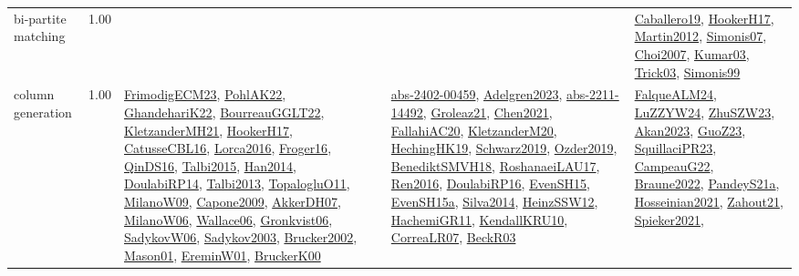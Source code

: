 {\begin{longtable}{p{3cm}r>{\raggedright\arraybackslash}p{6cm}>{\raggedright\arraybackslash}p{6cm}>{\raggedright\arraybackslash}p{8cm}}
\index{bi-partite matching}\index{Algorithms!bi-partite matching}bi-partite matching &  1.00 &  &  & \hyperref[detail:Caballero19]{Caballero19}, \hyperref[detail:HookerH17]{HookerH17}, \hyperref[detail:Martin2012]{Martin2012}, \hyperref[detail:Simonis07]{Simonis07}, \hyperref[detail:Choi2007]{Choi2007}, \hyperref[detail:Kumar03]{Kumar03}, \hyperref[detail:Trick03]{Trick03}, \hyperref[detail:Simonis99]{Simonis99}\\
\index{column generation}\index{Algorithms!column generation}column generation &  1.00 & \hyperref[detail:FrimodigECM23]{FrimodigECM23}, \hyperref[detail:PohlAK22]{PohlAK22}, \hyperref[detail:GhandehariK22]{GhandehariK22}, \hyperref[detail:BourreauGGLT22]{BourreauGGLT22}, \hyperref[detail:KletzanderMH21]{KletzanderMH21}, \hyperref[detail:HookerH17]{HookerH17}, \hyperref[detail:CatusseCBL16]{CatusseCBL16}, \hyperref[detail:Lorca2016]{Lorca2016}, \hyperref[detail:Froger16]{Froger16}, \hyperref[detail:QinDS16]{QinDS16}, \hyperref[detail:Talbi2015]{Talbi2015}, \hyperref[detail:Han2014]{Han2014}, \hyperref[detail:DoulabiRP14]{DoulabiRP14}, \hyperref[detail:Talbi2013]{Talbi2013}, \hyperref[detail:TopalogluO11]{TopalogluO11}, \hyperref[detail:MilanoW09]{MilanoW09}, \hyperref[detail:Capone2009]{Capone2009}, \hyperref[detail:AkkerDH07]{AkkerDH07}, \hyperref[detail:MilanoW06]{MilanoW06}, \hyperref[detail:Wallace06]{Wallace06}, \hyperref[detail:Gronkvist06]{Gronkvist06}, \hyperref[detail:SadykovW06]{SadykovW06}, \hyperref[detail:Sadykov2003]{Sadykov2003}, \hyperref[detail:Brucker2002]{Brucker2002}, \hyperref[detail:Mason01]{Mason01}, \hyperref[detail:EreminW01]{EreminW01}, \hyperref[detail:BruckerK00]{BruckerK00} & \hyperref[detail:abs-2402-00459]{abs-2402-00459}, \hyperref[detail:Adelgren2023]{Adelgren2023}, \hyperref[detail:abs-2211-14492]{abs-2211-14492}, \hyperref[detail:Groleaz21]{Groleaz21}, \hyperref[detail:Chen2021]{Chen2021}, \hyperref[detail:FallahiAC20]{FallahiAC20}, \hyperref[detail:KletzanderM20]{KletzanderM20}, \hyperref[detail:HechingHK19]{HechingHK19}, \hyperref[detail:Schwarz2019]{Schwarz2019}, \hyperref[detail:Ozder2019]{Ozder2019}, \hyperref[detail:BenediktSMVH18]{BenediktSMVH18}, \hyperref[detail:RoshanaeiLAU17]{RoshanaeiLAU17}, \hyperref[detail:Ren2016]{Ren2016}, \hyperref[detail:DoulabiRP16]{DoulabiRP16}, \hyperref[detail:EvenSH15]{EvenSH15}, \hyperref[detail:EvenSH15a]{EvenSH15a}, \hyperref[detail:Silva2014]{Silva2014}, \hyperref[detail:HeinzSSW12]{HeinzSSW12}, \hyperref[detail:HachemiGR11]{HachemiGR11}, \hyperref[detail:KendallKRU10]{KendallKRU10}, \hyperref[detail:CorreaLR07]{CorreaLR07}, \hyperref[detail:BeckR03]{BeckR03} & \hyperref[detail:FalqueALM24]{FalqueALM24}, \hyperref[detail:LuZZYW24]{LuZZYW24}, \hyperref[detail:ZhuSZW23]{ZhuSZW23}, \hyperref[detail:Akan2023]{Akan2023}, \hyperref[detail:GuoZ23]{GuoZ23}, \hyperref[detail:SquillaciPR23]{SquillaciPR23}, \hyperref[detail:CampeauG22]{CampeauG22}, \hyperref[detail:Braune2022]{Braune2022}, \hyperref[detail:PandeyS21a]{PandeyS21a}, \hyperref[detail:Hosseinian2021]{Hosseinian2021}, \hyperref[detail:Zahout21]{Zahout21}, \hyperref[detail:Spieker2021]{Spieker2021}, 
\end{longtable}}

